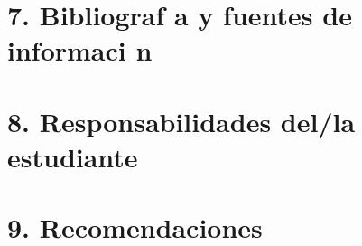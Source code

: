\documentclass{article}
\begin{document}
    \section*{7. Bibliograf a y fuentes de informaci n}
    \bibliografia
    


    \section*{8. Responsabilidades del/la estudiante}
    \responsabilidadesEstudiantes
    

    \section*{9. Recomendaciones}
    \recomendacionesEstudiantes
    
\end{document}
